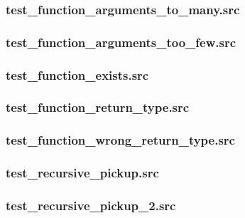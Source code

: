 \documentclass[a4paper,10pt,titlepage]{report}
\begin{document}
\subsubsection{test_function_arguments_to_many.src}


\subsubsection{test_function_arguments_too_few.src}


\subsubsection{test_function_exists.src}


\subsubsection{test_function_return_type.src}


\subsubsection{test_function_wrong_return_type.src}


\subsubsection{test_recursive_pickup.src}


\subsubsection{test_recursive_pickup_2.src}

\end{document}

